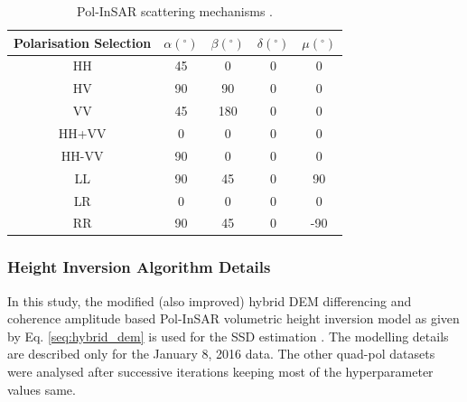 \documentclass[12pt]{elsarticle}
\numberwithin{equation}{section}
\numberwithin{figure}{section}
\numberwithin{table}{section}
\begin{document}
\begin{table}[ht]
\centering
\caption{Pol-InSAR scattering mechanisms \citep{Cloude2005}.}
\label{table:1}
\begin{tabular}{c c c c c}
\hline
\textbf{Polarisation Selection} & \boldmath$\alpha(^\circ)$   & \boldmath$\beta(^\circ)$     & \boldmath$\delta(^\circ)$ & \boldmath$\mu(^\circ)$       \\ \hline
HH                     & 45 & 0   & 0          & 0   \\ 
HV                     & 90 & 90  & 0          & 0   \\ 
VV                     & 45 & 180 & 0          & 0   \\ 
HH+VV                  & 0  & 0   & 0          & 0   \\ 
HH-VV                  & 90 & 0   & 0          & 0   \\ 
LL                     & 90 & 45  & 0          & 90  \\ 
LR                     & 0  & 0   & 0           & 0   \\ 
RR                     & 90 & 45  & 0          & -90 \\ \hline
\end{tabular}
\end{table}

\subsubsection{Height Inversion Algorithm Details}
In this study, the modified (also improved) hybrid DEM differencing and coherence amplitude based Pol-InSAR volumetric height inversion model as given by Eq. \eqref{seq:hybrid_dem} is used for the SSD estimation \citep{Majumdar2019a}. The modelling details are described only for the January 8, 2016 data. The other quad-pol datasets were analysed after successive iterations keeping most of the hyperparameter values same. 
\end{document}
